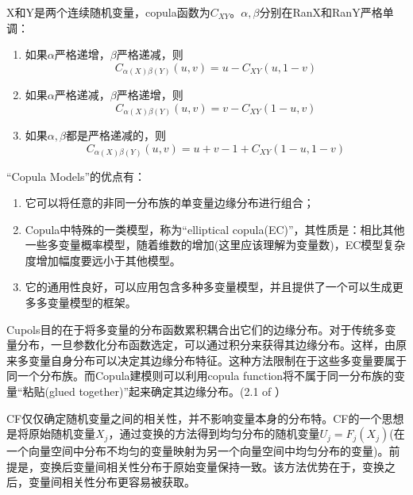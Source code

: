 \begin{theorem}
    X和Y是两个连续随机变量，copula函数为$C_{XY}$。$\alpha,\beta$分别在RanX和RanY严格单调：
    \begin{enumerate}
        \item 如果$\alpha$严格递增，$\beta$严格递减，则
            \begin{equation*}
                C_{\alpha(X)\beta(Y)}(u,v) = u- C_{XY}(u,1-v)
            \end{equation*}
        \item 如果$\alpha$严格递减，$\beta$严格递增，则
            \begin{equation*}
                 C_{\alpha(X)\beta(Y)}(u,v) = v- C_{XY}(1-u,v)
            \end{equation*}
        \item 如果$\alpha,\beta$都是严格递减的，则
            \begin{equation*}
                C_{\alpha(X)\beta(Y)}(u,v) = u+v-1+C_{XY}(1-u,1-v)
            \end{equation*}
    \end{enumerate}
    \label{thr2.4.4}

\end{theorem}

``Copula Models''的优点有\cite{Smith2009}：
\begin{enumerate}
    \item 它可以将任意的非同一分布族的单变量边缘分布进行组合；
    \item Copula中特殊的一类模型，称为``elliptical copula(EC)''，其性质是：相比其他一些多变量概率模型，随着维数的增加(这里应该理解为变量数)，EC模型复杂度增加幅度要远小于其他模型。
    \item 它的通用性良好，可以应用包含多种多变量模型，并且提供了一个可以生成更多多变量模型的框架。
\end{enumerate}

\textcolor[rgb]{1,0,0}{Cupols目的在于将多变量的分布函数累积耦合出它们的边缘分布。对于传统多变量分布，一旦参数化分布函数选定，可以通过积分来获得其边缘分布。这样，由原来多变量自身分布可以决定其边缘分布特征。这种方法限制在于这些多变量要属于同一个分布族。而Copula建模则可以利用copula function将不属于同一分布族的变量``粘贴(glued together)''起来确定其边缘分布。(2.1 of \cite{Smith2009}}）



CF仅仅确定随机变量之间的相关性，并不影响变量本身的分布特。CF的一个思想是将原始随机变量$X_j$，通过变换的方法得到均匀分布的随机变量$U_j = F_j(X_j)$(在一个向量空间中分布不均匀的变量映射为另一个向量空间中均匀分布的变量)。前提是，变换后变量间相关性分布于原始变量保持一致。该方法优势在于，变换之后，变量间相关性分布更容易被获取。




